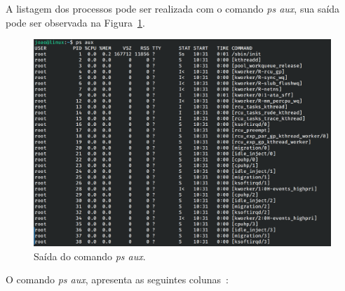 \documentclass[
	12pt,				%
	oneside,   	        %
	a4paper,			%
	english,			%
	french,				%
	spanish,			%
	brazil,				%
	]{pacotes/abntex2}
\begin{document}
A listagem dos processos pode ser realizada com o comando \textit{ps aux}, sua saída pode ser observada na Figura~\ref{fig:ps}.

\begin{figure}[H]
  \centering
  \includegraphics[scale=0.45]{figuras/ps.png}
  \caption{Saída do comando \textit{ps aux}.}
  \label{fig:ps}
\end{figure}

O comando \textit{ps aux}, apresenta as seguintes colunas~\cite{shotts2017}:
\end{document}
